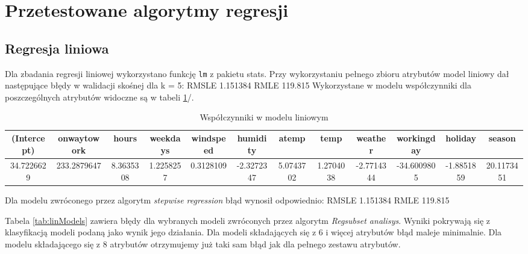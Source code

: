 \documentclass[a4paper,12pt]{article}
\begin{document}
    
\section{Przetestowane algorytmy regresji}

   \subsection{Regresja liniowa}
       Dla zbadania regresji liniowej wykorzystano funkcję \texttt{lm} z pakietu {stats}.
       Przy wykorzystaniu pełnego zbioru atrybutów model liniowy dał następujące błędy w walidacji skośnej dla k = 5:
       RMSLE 1.151384
       RMLE 119.815
        Wykorzystane w modelu współczynniki dla poszczególnych atrybutów widoczne są w tabeli \ref{tab:wspolczynnikiLin}/.
        
            \begin{table}
                \begin{tabular}{|c|c|c|c|c|c|c|c|c|c|c|c|}
                    \hline 
                    (Intercept) & onwaytowork & hours & weekdays & windspeed & humidity & atemp & temp & weather & workingday & holiday & season \\ 
                    \hline 
                    34.7226629 & 233.2879647 & 8.3635308 & 1.2258257 & 0.3128109 & -2.3272347 & 5.0743702 & 1.2704038 & -2.7714344 & -34.6009805 & -1.8851859 & 20.1173451 \\ 
                    \hline 
                \end{tabular}
                \caption{Współczynniki w modelu liniowym}
                \label{tab:wspolczynnikiLin}
        \end{table}  
        
        Dla modelu zwróconego przez algorytm \textit{stepwise regression} błąd wynosił odpowiednio:
        RMSLE 1.151384
        RMLE 119.815
        
        Tabela \ref{tab:linModels} zawiera błędy dla wybranych modeli zwróconych przez algorytm \textit{Regsubset analisys}. Wyniki pokrywają się z klasyfikacją modeli podaną jako wynik jego działania. Dla modeli składających się z 6 i więcej atrybutów błąd maleje minimalnie. Dla modelu składającego się z 8 atrybutów otrzymujemy już taki sam błąd jak dla pełnego zestawu atrybutów.
        
\end{document}
